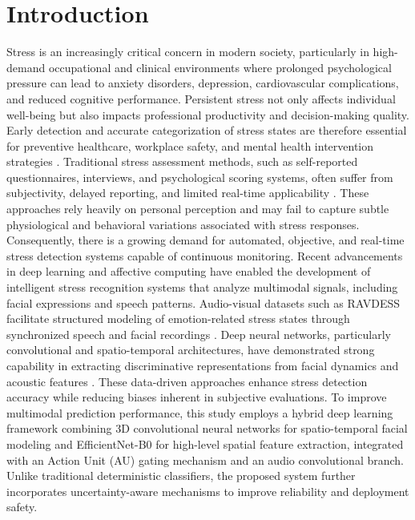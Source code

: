 \documentclass[conference]{IEEEtran}
\begin{document}
\section{Introduction}

Stress is an increasingly critical concern in modern society, particularly in high-demand occupational and clinical environments where prolonged psychological pressure can lead to anxiety disorders, depression, cardiovascular complications, and reduced cognitive performance. Persistent stress not only affects individual well-being but also impacts professional productivity and decision-making quality. Early detection and accurate categorization of stress states are therefore essential for preventive healthcare, workplace safety, and mental health intervention strategies \cite{ref1,ref2,ref3}.
Traditional stress assessment methods, such as self-reported questionnaires, interviews, and psychological scoring systems, often suffer from subjectivity, delayed reporting, and limited real-time applicability \cite{ref4,ref5}. These approaches rely heavily on personal perception and may fail to capture subtle physiological and behavioral variations associated with stress responses. Consequently, there is a growing demand for automated, objective, and real-time stress detection systems capable of continuous monitoring.
Recent advancements in deep learning and affective computing have enabled the development of intelligent stress recognition systems that analyze multimodal signals, including facial expressions and speech patterns. Audio-visual datasets such as RAVDESS facilitate structured modeling of emotion-related stress states through synchronized speech and facial recordings \cite{ref5}. Deep neural networks, particularly convolutional and spatio-temporal architectures, have demonstrated strong capability in extracting discriminative representations from facial dynamics and acoustic features \cite{ref6,ref7,ref8}. These data-driven approaches enhance stress detection accuracy while reducing biases inherent in subjective evaluations.
To improve multimodal prediction performance, this study employs a hybrid deep learning framework combining 3D convolutional neural networks for spatio-temporal facial modeling and EfficientNet-B0 for high-level spatial feature extraction, integrated with an Action Unit (AU) gating mechanism and an audio convolutional branch. Unlike traditional deterministic classifiers, the proposed system further incorporates uncertainty-aware mechanisms to improve reliability and deployment safety.
\end{document}
